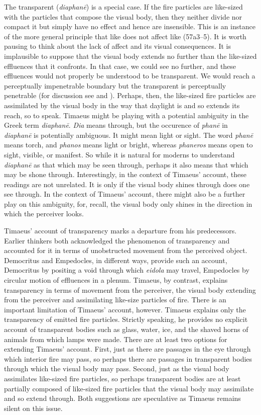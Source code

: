 The transparent (\emph{diaphanē}) is a special case. If the fire particles are like-sized with the particles that compose the visual body, then they neither divide nor compact it but simply have no effect and hence are insensible. This is an instance of the more general principle that like does not affect like (57a3--5). It is worth pausing to think about the lack of affect and its visual consequences. It is implausible to suppose that the visual body extends no further than the like-sized effluences that it confronts. In that case, we could see no further, and these effluences would not properly be understood to be transparent. We would reach a perceptually impenetrable boundary but the transparent is perceptually penetrable (for discussion see \citealt{Crowther:2018yt} and \citealt{Kalderon:2018wn}). Perhaps, then, the like-sized fire particles are assimilated by the visual body in the way that daylight is and so extends its reach, so to speak. Timaeus might be playing with a potential ambiguity in the Greek term \emph{diaphanē}. \emph{Dia} means through, but the occurence of \emph{phanē} in \emph{diaphanē} is potentially ambiguous. It might mean light or sight. The word \emph{phanē} means torch, and \emph{phanos} means light or bright, whereas \emph{phaneros} means open to sight, visible, or manifest. So while it is natural for moderns to understand \emph{diaphanē} as that which may be seen through, perhaps it also means that which may be shone through. Interestingly, in the context of Timaeus' account, these readings are not unrelated. It is only if the visual body shines through does one see through. In the context of Timaeus' account, there might also be a further play on this ambiguity, for, recall, the visual body only shines in the direction in which the perceiver looks.

Timaeus' account of transparency marks a departure from his predecessors. Earlier thinkers both acknowledged the phenomenon of transparency and accounted for it in terms of unobstructed movement from the perceived object. Democritus and Empedocles, in different ways, provide such an account, Democritus by positing a void through which \emph{eidola} may travel, Empedocles by circular motion of effluences in a plenum. Timaeus, by contrast, explains transparency in terms of movement from the perceiver, the visual body extending from the perceiver and assimilating like-size particles of fire. There is an important limitation of Timaeus' account, however. Timaeus explains only the transparency of emitted fire particles. Strictly speaking, he provides no explicit account of transparent bodies such as glass, water, ice, and the shaved horns of animals from which lamps were made. There are at least two options for extending Timaeus' account. First, just as there are passages in the eye through which interior fire may pass, so perhaps there are passages in transparent bodies through which the visual body may pass. Second, just as the visual body assimilates like-sized fire particles, so perhaps transparent bodies are at least partially composed of like-sized fire particles that the visual body may assimilate and so extend through. Both suggestions are speculative as Timaeus remains silent on this issue.


